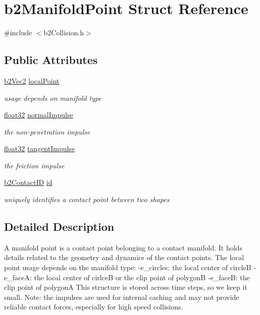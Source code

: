 \hypertarget{structb2_manifold_point}{}\section{b2\+Manifold\+Point Struct Reference}
\label{structb2_manifold_point}


{\ttfamily \#include $<$b2\+Collision.\+h$>$}

\subsection*{Public Attributes}
\begin{DoxyCompactItemize}
\item 
\mbox{\hyperlink{structb2_vec2}{b2\+Vec2}} \mbox{\hyperlink{structb2_manifold_point_ab3616990e7d1644deeeb691246094bfa}{local\+Point}}
\begin{DoxyCompactList}\small\item\em usage depends on manifold type \end{DoxyCompactList}\item 
\mbox{\hyperlink{b2_settings_8h_aacdc525d6f7bddb3ae95d5c311bd06a1}{float32}} \mbox{\hyperlink{structb2_manifold_point_af4218c2359cb7762cd4e9d8ecefab173}{normal\+Impulse}}
\begin{DoxyCompactList}\small\item\em the non-\/penetration impulse \end{DoxyCompactList}\item 
\mbox{\hyperlink{b2_settings_8h_aacdc525d6f7bddb3ae95d5c311bd06a1}{float32}} \mbox{\hyperlink{structb2_manifold_point_a0ac5375b1fc4675a0073129f56aa62c9}{tangent\+Impulse}}
\begin{DoxyCompactList}\small\item\em the friction impulse \end{DoxyCompactList}\item 
\mbox{\hyperlink{unionb2_contact_i_d}{b2\+Contact\+ID}} \mbox{\hyperlink{structb2_manifold_point_afa7ec272b2b27abe129540f8fbe57fc5}{id}}
\begin{DoxyCompactList}\small\item\em uniquely identifies a contact point between two shapes \end{DoxyCompactList}\end{DoxyCompactItemize}


\subsection{Detailed Description}
A manifold point is a contact point belonging to a contact manifold. It holds details related to the geometry and dynamics of the contact points. The local point usage depends on the manifold type\+: -\/e\+\_\+circles\+: the local center of circleB -\/e\+\_\+faceA\+: the local center of cirlceB or the clip point of polygonB -\/e\+\_\+faceB\+: the clip point of polygonA This structure is stored across time steps, so we keep it small. Note\+: the impulses are used for internal caching and may not provide reliable contact forces, especially for high speed collisions. 

